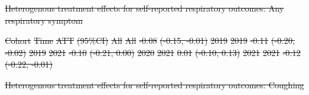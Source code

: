 \documentclass[
  letterpaper,
  DIV=11,
  numbers=noendperiod]{scrartcl}
\makeatletter
\renewenvironment{table}%
   {\renewcommand\familydefault\sfdefault
    \@float{table}}
   {\end@float}
\providecommand{\DIFdel}[1]{{\protect\color{red}\sout{#1}}}                      %
\providecommand{\DIFdelbegin}{} %
\providecommand{\DIFdelFL}[1]{\DIFdel{#1}} %
\newcommand{\DIFscaledelfig}{0.5}
\newlength{\DIFdelgraphicswidth} %
\newlength{\DIFdelgraphicsheight} %
\newcommand{\DIFdelincludegraphics}[2][]{%
\sbox{\DIFdelgraphicsbox}{\DIFOincludegraphics[#1]{#2}}%
\settoboxwidth{\DIFdelgraphicswidth}{\DIFdelgraphicsbox} %
\settoboxtotalheight{\DIFdelgraphicsheight}{\DIFdelgraphicsbox} %
\scalebox{\DIFscaledelfig}{%
\parbox[b]{\DIFdelgraphicswidth}{\usebox{\DIFdelgraphicsbox}\\[-\baselineskip] \rule{\DIFdelgraphicswidth}{0em}}\llap{\resizebox{\DIFdelgraphicswidth}{\DIFdelgraphicsheight}{%
\setlength{\unitlength}{\DIFdelgraphicswidth}%
\begin{picture}(1,1)%
\thicklines\linethickness{2pt} %
{\color[rgb]{1,0,0}\put(0,0){\framebox(1,1){}}}%
{\color[rgb]{1,0,0}\put(0,0){\line( 1,1){1}}}%
{\color[rgb]{1,0,0}\put(0,1){\line(1,-1){1}}}%
\end{picture}%
}\hspace*{3pt}}} %
} %
\DeclareRobustCommand{\DIFdelbegin}{\DIFOdelbegin \let\includegraphics\DIFdelincludegraphics} %
\makeatother
\begin{document}
\DIFdelbegin %
{%
\DIFdelFL{Heterogenous treatment effects for self-reported respiratory outcomes:
Any respiratory symptom }}%

\DIFdelFL{Cohort }%
\DIFdelFL{Time }%
\DIFdelFL{ATT }%
\DIFdelFL{(95\%CI)}%
\DIFdelFL{All }%
\DIFdelFL{All }%
\DIFdelFL{-0.08 }%
\DIFdelFL{(-0.15, -0.01)}%
\DIFdelFL{2019 }%
\DIFdelFL{2019 }%
\DIFdelFL{-0.11 }%
\DIFdelFL{(-0.20, -0.02)}%
\DIFdelFL{2019 }%
\DIFdelFL{2021 }%
\DIFdelFL{-0.10 }%
\DIFdelFL{(-0.21, 0.00)}%
\DIFdelFL{2020 }%
\DIFdelFL{2021 }%
\DIFdelFL{0.01 }%
\DIFdelFL{(-0.10, 0.13)}%
\DIFdelFL{2021 }%
\DIFdelFL{2021 }%
\DIFdelFL{-0.12 }%
\DIFdelFL{(-0.22, -0.01)}%

{%
\DIFdelFL{Heterogenous treatment effects for self-reported respiratory outcomes:
Coughing }}%
\end{document}
